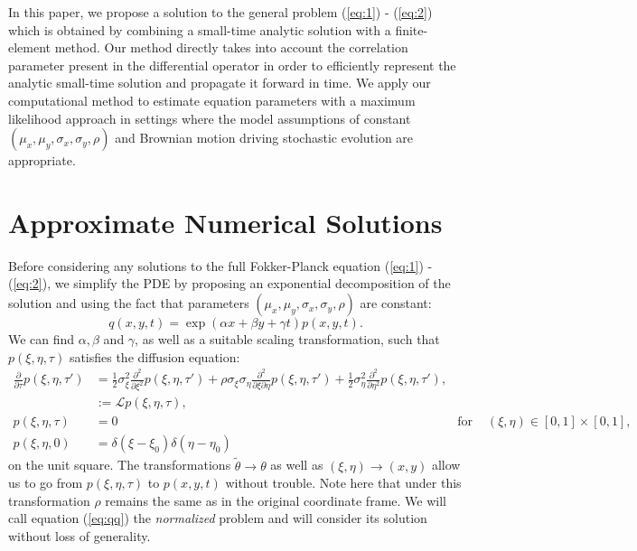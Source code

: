 \documentclass[10pt]{article}
\begin{document}
In this paper, we propose a solution to the general problem
(\ref{eq:1}) - (\ref{eq:2}) which is obtained by combining a
small-time analytic solution with a finite-element method. Our method
directly takes into account the correlation parameter present in the
differential operator in order to efficiently represent the analytic
small-time solution and propagate it forward in time. We apply our
computational method to estimate equation parameters with a maximum
likelihood approach in settings where the model assumptions of
constant $(\mu_x, \mu_y, \sigma_x, \sigma_y, \rho)$ and Brownian
motion driving stochastic evolution are appropriate.


\section{Approximate Numerical Solutions}
Before considering any solutions to the full Fokker-Planck equation
(\ref{eq:1}) - (\ref{eq:2}), we simplify the PDE by proposing an
exponential decomposition of the solution and using the fact that parameters
$(\mu_x, \mu_y, \sigma_x, \sigma_y, \rho)$ are constant:
\[
  q(x,y,t) = \exp(\alpha x + \beta y + \gamma t) p(x,y,t).
\]
We can find $\alpha, \beta$ and $\gamma$, as well as a suitable
scaling transformation, such that $p(\xi,\eta,\tau)$ satisfies the diffusion
equation:
\begin{align}
  \frac{\partial}{\partial \tau} p(\xi,\eta,\tau') &= \frac{1}{2}\sigma_\xi^2
  \frac{\partial^2}{\partial \xi^2}p(\xi,\eta,\tau') + \rho\sigma_\xi\sigma_\eta
  \frac{\partial^2}{\partial \xi \partial \eta}p(\xi,\eta,\tau') +
                                                     \frac{1}{2}\sigma_\eta^2 \frac{\partial^2}{\partial \eta^2}p(\xi,\eta,\tau') , \label{eq:qq} \\
  &:= \mathcal{L}p(\xi,\eta,\tau) , \\
  p(\xi,\eta,\tau) &=0 &\mbox{for } & (\xi,\eta) \in [0,1] \times [0,1], \nonumber \\
  p(\xi,\eta,0) &= \delta(\xi-\xi_0) \delta(\eta-\eta_0) \nonumber
\end{align}
on the unit square.  The transformations $\tilde{\theta} \to \theta$
as well as $(\xi,\eta) \to (x,y)$ allow us to go from
$p(\xi,\eta,\tau)$ to $p(x,y,t)$ without trouble. Note here that under
this transformation $\rho$ remains the same as in the original
coordinate frame. We will call equation (\ref{eq:qq}) the
\textit{normalized} problem and will consider its solution without
loss of generality.
\end{document}
